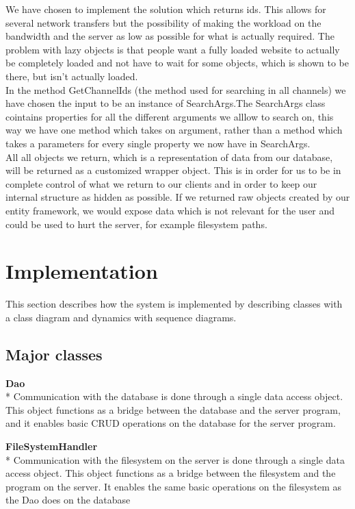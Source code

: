 \documentclass[a4paper,11pt,report]{article}
\begin{document}
We have chosen to implement the solution which returns ids. This allows for several network transfers but the possibility of making the workload on the bandwidth and the server as low as possible for what is actually required. The problem with lazy objects is that people want a fully loaded website to actually be completely loaded and not have to wait for some objects, which is shown to be there, but isn't actually loaded. \\
In the method GetChannelIds (the method used for searching in all channels) we have chosen the input to be an instance of SearchArgs.The  SearchArgs class cointains properties for all the different arguments we alllow to search on, this way we have one method which takes on argument, rather than a method which takes a parameters for every single property we now have in SearchArgs. \\
All all objects we return, which is a representation of data from our database, will be returned as a customized wrapper object. This is in order for us to be in complete control of what we return to our clients and in order to keep our internal structure as hidden as possible. If we returned raw objects created by our entity framework, we would expose data which is not relevant for the user and could be used to hurt the server, for example filesystem paths.

\section{Implementation}
This section describes how the system is implemented by describing classes with a class diagram and dynamics with sequence diagrams.

\subsection{Major classes}
\textbf{Dao} \\*
Communication with the database is done through a single data access object. This object functions as a bridge between the database and the server program, and it enables basic CRUD operations on the database for the server program. 

\textbf{FileSystemHandler} \\*
Communication with the filesystem on the server is done through a single data access object. This object functions as a bridge between the filesystem and the program on the server. It enables the same basic operations on the filesystem as the Dao does on the database
\end{document}
